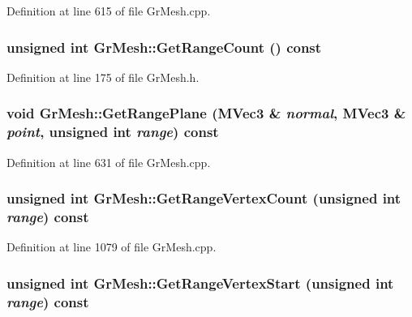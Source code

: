 Definition at line 615 of file GrMesh.cpp.\hypertarget{class_gr_mesh_9ba0c112005117c8c77be35fca892c03}{
\subsubsection[{GetRangeCount}]{\setlength{\rightskip}{0pt plus 5cm}unsigned int GrMesh::GetRangeCount () const}}
\label{class_gr_mesh_9ba0c112005117c8c77be35fca892c03}




Definition at line 175 of file GrMesh.h.\hypertarget{class_gr_mesh_d0b90ad938d228f7cdce75600e9fc937}{
\subsubsection[{GetRangePlane}]{\setlength{\rightskip}{0pt plus 5cm}void GrMesh::GetRangePlane ({\bf MVec3} \& {\em normal}, \/  {\bf MVec3} \& {\em point}, \/  unsigned int {\em range}) const}}
\label{class_gr_mesh_d0b90ad938d228f7cdce75600e9fc937}




Definition at line 631 of file GrMesh.cpp.\hypertarget{class_gr_mesh_47e18fec5f6a5e448cff0b5f27008aa6}{
\subsubsection[{GetRangeVertexCount}]{\setlength{\rightskip}{0pt plus 5cm}unsigned int GrMesh::GetRangeVertexCount (unsigned int {\em range}) const}}
\label{class_gr_mesh_47e18fec5f6a5e448cff0b5f27008aa6}




Definition at line 1079 of file GrMesh.cpp.\hypertarget{class_gr_mesh_de8aa56cad498c5eb9e362fd3e5618cd}{
\subsubsection[{GetRangeVertexStart}]{\setlength{\rightskip}{0pt plus 5cm}unsigned int GrMesh::GetRangeVertexStart (unsigned int {\em range}) const}}
\label{class_gr_mesh_de8aa56cad498c5eb9e362fd3e5618cd}





